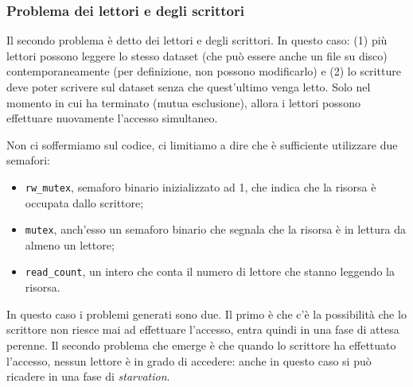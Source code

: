 % 
\subsubsection{Problema dei lettori e degli scrittori}
Il secondo problema è detto dei lettori e degli scrittori. In questo caso: (1) più lettori possono leggere lo stesso dataset (che può essere anche un file su disco) contemporaneamente (per definizione, non possono modificarlo) e (2) lo scritture deve poter scrivere sul dataset senza che quest'ultimo venga letto. Solo nel momento in cui ha terminato (mutua esclusione), allora i lettori possono effettuare nuovamente l'accesso simultaneo. 

Non ci soffermiamo sul codice, ci limitiamo a dire che è sufficiente utilizzare due semafori:
\vspace{-5px}
\begin{itemize}
\setlength{\itemsep}{-.25 em}
    \item \texttt{rw\_mutex}, semaforo binario inizializzato ad 1, che indica che la risorsa è occupata dallo scrittore;
    \item \texttt{mutex}, anch'esso un semaforo binario che segnala che la risorsa è in lettura da almeno un lettore;
    \item \texttt{read\_count}, un intero che conta il numero di lettore che stanno leggendo la risorsa.
\end{itemize}

In questo caso i problemi generati sono due. Il primo è che c'è la possibilità che lo scrittore non riesce mai ad effettuare l'accesso, entra quindi in una fase di attesa perenne. Il secondo problema che emerge è che quando lo scrittore ha effettuato l'accesso, nessun lettore è in grado di accedere: anche in questo caso si può ricadere in una fase di \textit{starvation}.

% 
